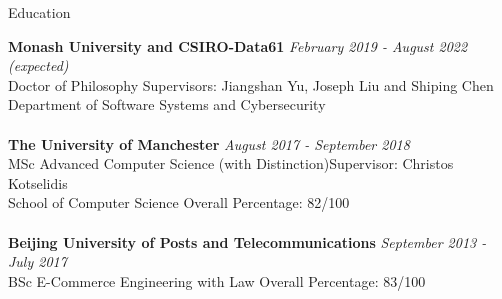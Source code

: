 \documentclass{resume} %
\begin{document}

\begin{rSection}{Education}

    {\bf Monash University and CSIRO-Data61} \hfill {\em February 2019 - August 2022 (expected)}
    \\ Doctor of Philosophy\hfill { Supervisors: Jiangshan Yu, Joseph Liu and Shiping Chen}
    \\ Department of Software Systems and Cybersecurity\\
    \\{\bf The University of Manchester} \hfill {\em August 2017 - September 2018}
    \\ MSc Advanced Computer Science (with Distinction)\hfill {Supervisor: Christos Kotselidis}
    \\ School of Computer Science\hfill { Overall Percentage: 82/100 }\\
    \\{\bf Beijing University of Posts and Telecommunications} \hfill {\em September 2013 - July 2017}
    \\ BSc E-Commerce Engineering with Law\hfill { Overall Percentage: 83/100 }


\end{rSection}
\end{document}
